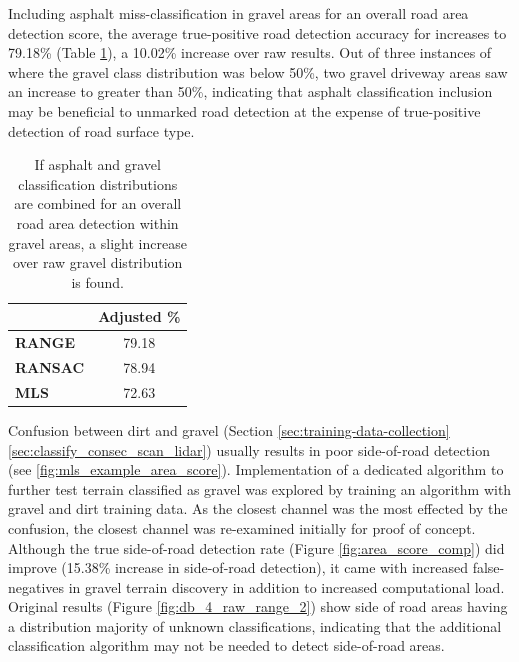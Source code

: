 \documentclass[numbered,pdftex]{ohio-etd}
\begin{document}
{{{		{Including asphalt miss-classification in gravel areas for an overall road area detection score, the average true-positive road detection accuracy for increases to 79.18\% (Table \ref{tab:adjusted_grav_avg_score}), a 10.02\% increase over raw results. Out of three instances of where the gravel class distribution was below 50\%, two gravel driveway areas saw an increase to greater than 50\%, indicating that asphalt classification inclusion may be beneficial to unmarked road detection at the expense of true-positive detection of road surface type.}
	
		\begin{table}[]
			\centering
			\begin{tabular}{l|c}
									& Adjusted \% \\
				\hline
				\textbf{RANGE}  	& 79.18       \\[-4pt]
				\textbf{RANSAC} 	& 78.94       \\[-4pt]
				\textbf{MLS}    	& 72.63      
			\end{tabular}
			\caption[Adjusted Averaged Gravel Area Score]{If asphalt and gravel classification distributions are combined for an overall road area detection within gravel areas, a slight increase over raw gravel distribution is found.}
			\label{tab:adjusted_grav_avg_score}
		\end{table}

		{Confusion between dirt and gravel (Section \ref{sec:training-data-collection} \ref{sec:classify_consec_scan_lidar}) usually results in poor side-of-road detection (see \ref{fig:mls_example_area_score}). Implementation of a dedicated algorithm to further test terrain classified as gravel was explored by training an algorithm with gravel and dirt training data. As the closest channel was the most effected by the confusion, the closest channel was re-examined initially for proof of concept. Although the true side-of-road detection rate (Figure \ref{fig:area_score_comp}) did improve (15.38\% increase in side-of-road detection), it came with increased false-negatives in gravel terrain discovery in addition to increased computational load. Original results (Figure \ref{fig:db_4_raw_range_2}) show side of road areas having a distribution majority of unknown classifications, indicating that the additional classification algorithm may not be needed to detect side-of-road areas.} 
		
}}}
\end{document}
